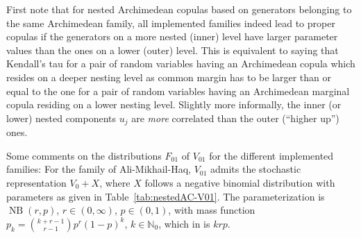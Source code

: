 \documentclass[nojss,article]{jss}
\theoremstyle{mythmstyle}
\newcommand*{\R}{\proglang{R}}%
\newcommand*{\IN}{\mathbb{N}}
\newcommand*{\NB}{\operatorname*{NB}}
\begin{document}
First note that for nested Archimedean copulas based on generators belonging to
the same Archimedean family, all implemented families indeed lead to proper
copulas if the generators on a more nested (inner) level have larger parameter
values than the ones on a lower (outer) level. This is equivalent to saying that
Kendall's tau for a pair of random variables having an Archimedean copula
which resides on a deeper nesting level as common margin has to be larger than
or equal to the one for a pair of random variables having an Archimedean
marginal copula residing on a lower nesting level.
Slightly more informally, the inner (or lower) nested components $u_j$ are
\emph{more} correlated than the outer (``higher up'') ones.

Some comments on the distributions $F_{01}$ of $V_{01}$ for the
different implemented families: For the family of Ali-Mikhail-Haq, $V_{01}$
admits the stochastic representation $V_0+X$, where $X$ follows a negative
binomial distribution with parameters as given in Table~\ref{tab:nestedAC-V01}. The
parameterization is $\NB(r,p)$, $r\in(0,\infty)$, $p\in(0,1)$, with mass
function $p_k=\binom{k+r-1}{r-1}p^r(1-p)^k$, $k\in\IN_0$, which in \R{} is
$k$$r$$p$\code{)}.
\end{document}
